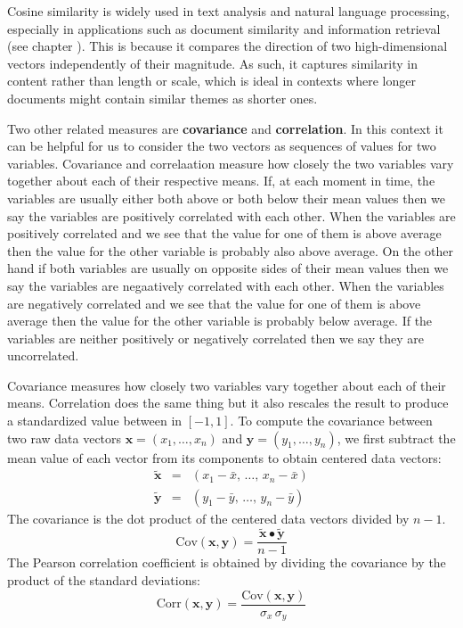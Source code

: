    Cosine similarity is widely used in text analysis and natural language 
processing, especially in applications such as document similarity and 
information retrieval (see chapter ).  This is 
because it compares the direction of two high-dimensional vectors independently
of their magnitude.  As such, it captures similarity in content rather than 
length or scale, which is ideal in contexts where longer documents might 
contain similar themes as shorter ones.

   Two other related measures are \textbf{covariance} and \textbf{correlation}.
In this context it can be helpful for us to consider the two vectors as 
sequences of values for two variables.  Covariance and correlaation measure how 
closely the two variables vary together about each of their respective means.  
If, at each moment in time, the variables are usually either both above or both 
below their mean values then we say the variables are positively correlated 
with each other.  When the variables are positively correlated and we see that
the value for one of them is above average then the value for the other 
variable is probably also above average.  On the other hand if both variables 
are usually on opposite sides of their mean values then we say the variables 
are negaatively correlated with each other.  When the variables are negatively 
correlated and we see that the value for one of them is above average then the 
value for the other variable is probably below average.  If the variables are
neither positively or negatively correlated then we say they are uncorrelated.

Covariance measures how closely two variables vary together about each of their
means.  Correlation does the same thing but it also rescales the result to 
produce a standardized value between in $[-1,1]$.  To compute the covariance 
between two raw data vectors $\mathbf{x} = (x_1, \dots, x_n)$ and $\mathbf{y} =
(y_1, \dots, y_n)$, we first subtract the mean value of each vector from 
its components to obtain centered data vectors:
\begin{eqnarray}
\tilde{\mathbf{x}} &=& (x_1 - \bar{x}, \, \dots, \, x_n - \bar{x}) 
                                                             \nonumber \\[1mm]
\tilde{\mathbf{y}} &=& (y_1 - \bar{y}, \, \dots, \, y_n - \bar{y}) 
\end{eqnarray}
The covariance is the dot product of the centered data vectors divided by
$n-1$.
\begin{equation}
\mathrm{Cov}(\mathbf{x}, \mathbf{y}) = \frac{\tilde{\mathbf{x}} \bullet 
                                             \tilde{\mathbf{y}}}{n-1} 
\end{equation}
The Pearson correlation coefficient is obtained by dividing the
covariance by the product of the standard deviations: 
\begin{equation}
\mathrm{Corr}(\mathbf{x}, \mathbf{y}) = 
\frac{\mathrm{Cov}(\mathbf{x}, \mathbf{y})}{\sigma_x \, \sigma_y}
\end{equation}


